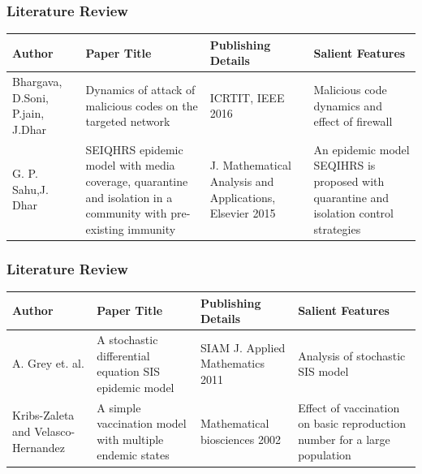 \documentclass{beamer}
\begin{document}
\begin{frame}\frametitle{Literature Review}
\begin{table}
\label{table:sen}
\begin{tabular}{|p{1.5 cm}|p{3 cm}|p{2 cm}|p{2.5 cm}|}
\hline
\bf Author & \bf Paper Title &\bf Publishing Details &\bf Salient Features\\
\hline
Bhargava, D.Soni, P.jain, J.Dhar&Dynamics of attack of malicious codes on the targeted network &ICRTIT, IEEE 2016&Malicious code dynamics and effect of firewall\cite{edtr15} \\
\hline
G. P. Sahu,J. Dhar&SEIQHRS epidemic model with media coverage, quarantine and isolation in a community with pre-existing immunity&J. Mathematical Analysis and Applications, Elsevier 2015&An epidemic model SEQIHRS is proposed with quarantine and isolation control strategies \cite{edtr13}\\
\hline

\end{tabular}
\end{table}
\end{frame}

\begin{frame}\frametitle{Literature Review}
\begin{table}
\label{table:sen2}
\begin{tabular}{|p{1.5 cm}|p{3 cm}|p{2 cm}|p{2.5 cm}|}
\hline
\bf Author & \bf Paper Title &\bf Publishing Details &\bf Salient Features\\
\hline
A. Grey et. al.&A stochastic differential equation SIS epidemic model & SIAM J. Applied Mathematics 2011&Analysis of stochastic  SIS model \cite{edtr17}\\
\hline
Kribs-Zaleta and Velasco-Hernandez& A simple vaccination model with multiple endemic states & Mathematical biosciences 2002 & Effect of vaccination on basic reproduction number for a large population \cite{edtr21}\\
\hline
\end{tabular}
\end{table}
\end{frame}

\end{document}
